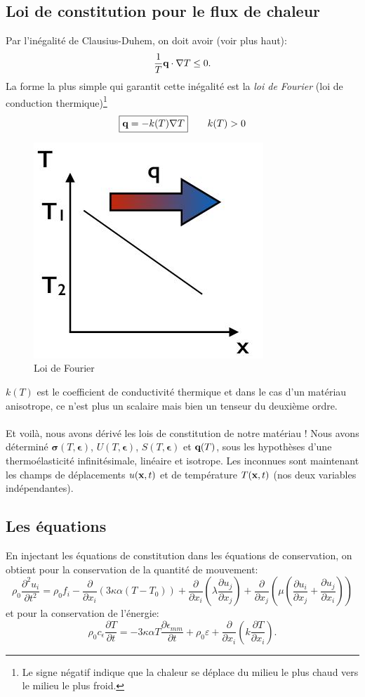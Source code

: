 \subsection{Loi de constitution pour le flux de chaleur}
Par l'inégalité de Clausius-Duhem, on doit avoir (voir plus haut):
$$\frac{1}{T}\textbf{q}\cdot\nabla T\leq 0.$$  La forme la plus simple qui garantit cette inégalité est la \emph{loi de Fourier} (loi de conduction thermique)\footnote{Le signe négatif indique que la chaleur se déplace du milieu le plus chaud vers le milieu le plus froid.}
$$\boxed{\textbf{q}=-k(T)\nabla T} \qquad k(T)>0$$
\begin{figure}[!h]
\centering
\includegraphics[scale=0.6]{./fourier.jpg}
\caption{Loi de Fourier}
\end{figure}
$k(T)$ est le coefficient de conductivité thermique et dans le cas d'un matériau anisotrope, ce n'est plus un scalaire mais bien un tenseur du deuxième ordre.
\paragraph{}
Et voilà, nous avons dérivé les lois de constitution de notre matériau ! Nous avons déterminé $\boldsymbol{\sigma}(T,\boldsymbol{\epsilon})$, $U(T,\boldsymbol{\epsilon})$, $S(T,\boldsymbol{\epsilon})$ et $\textbf{q}(T)$, sous les hypothèses d'une thermoélasticité infinitésimale, linéaire et isotrope. Les inconnues sont maintenant les champs de déplacements $u(\textbf{x},t)$ et de température $T(\textbf{x},t)$ (nos deux variables indépendantes).
\subsection{Les équations}
En injectant les équations de constitution dans les équations de conservation, on obtient pour la conservation de la quantité de mouvement:
$$\rho_0\frac{\partial^2u_i}{\partial t^2}=\rho_0f_i-\frac{\partial}{\partial x_i}(3\kappa\alpha(T-T_0))+\frac{\partial}{\partial x_i}\left(\lambda\frac{\partial u_j}{\partial x_j}\right)+\frac{\partial}{\partial x_j}\left(\mu\left(\frac{\partial u_i}{\partial x_j}+\frac{\partial u_j}{\partial x_i}\right)\right)$$
et pour la conservation de l'énergie:
$$\rho_0c_\epsilon\frac{\partial T}{\partial t}=-3\kappa\alpha T\frac{\partial\epsilon_{mm}}{\partial t}+\rho_0\varepsilon+\frac{\partial}{\partial x_i}\left(k\frac{\partial T}{\partial x_i}\right).$$
